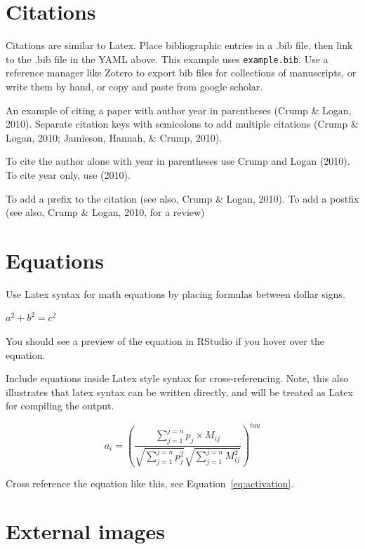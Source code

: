 \documentclass[
  english,
  man]{apa6}
\begin{document}
\hypertarget{citations}{%
\section{Citations}\label{citations}}

Citations are similar to Latex. Place bibliographic entries in a .bib file, then link to the .bib file in the YAML above. This example uses \texttt{example.bib}. Use a reference manager like Zotero to export bib files for collections of manuscripts, or write them by hand, or copy and paste from google scholar.

An example of citing a paper with author year in parentheses (Crump \& Logan, 2010). Separate citation keys with semicolons to add multiple citations (Crump \& Logan, 2010; Jamieson, Hannah, \& Crump, 2010).

To cite the author alone with year in parentheses use Crump and Logan (2010). To cite year only, use (2010).

To add a prefix to the citation (see also, Crump \& Logan, 2010). To add a postfix (see also, Crump \& Logan, 2010, for a review)

\hypertarget{equations}{%
\section{Equations}\label{equations}}

Use Latex syntax for math equations by placing formulas between dollar signs.

\(a^2 + b^2 = c^2\)

You should see a preview of the equation in RStudio if you hover over the equation.

Include equations inside Latex style syntax for cross-referencing. Note, this also illustrates that latex syntax can be written directly, and will be treated as Latex for compiling the output.

\begin{equation}
a_i = (\frac{\sum_{j=1}^{j=n}p_j \times M_{ij}}{\sqrt{\sum_{j=1}^{j=n}p_j^2}\sqrt{\sum_{j=1}^{j=n}M_{ij}^2}})^{tau}
\label{eq:activation}
\end{equation}

Cross reference the equation like this, see Equation~\eqref{eq:activation}.

\hypertarget{external-images}{%
\section{External images}\label{external-images}}
\end{document}

